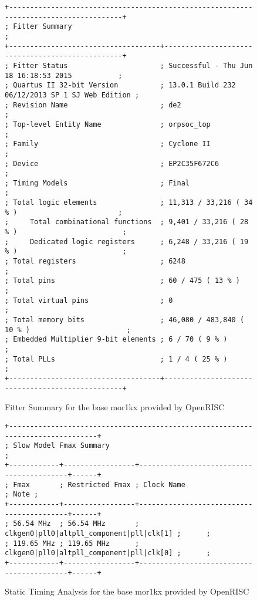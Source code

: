 \begin{figure}[t]
  \centering
  \footnotesize
  \begin{verbatim}
+--------------------------------------------------------------------------------------+
; Fitter Summary                                                                       ;
+------------------------------------+-------------------------------------------------+
; Fitter Status                      ; Successful - Thu Jun 18 16:18:53 2015           ;
; Quartus II 32-bit Version          ; 13.0.1 Build 232 06/12/2013 SP 1 SJ Web Edition ;
; Revision Name                      ; de2                                             ;
; Top-level Entity Name              ; orpsoc_top                                      ;
; Family                             ; Cyclone II                                      ;
; Device                             ; EP2C35F672C6                                    ;
; Timing Models                      ; Final                                           ;
; Total logic elements               ; 11,313 / 33,216 ( 34 % )                        ;
;     Total combinational functions  ; 9,401 / 33,216 ( 28 % )                         ;
;     Dedicated logic registers      ; 6,248 / 33,216 ( 19 % )                         ;
; Total registers                    ; 6248                                            ;
; Total pins                         ; 60 / 475 ( 13 % )                               ;
; Total virtual pins                 ; 0                                               ;
; Total memory bits                  ; 46,080 / 483,840 ( 10 % )                       ;
; Embedded Multiplier 9-bit elements ; 6 / 70 ( 9 % )                                  ;
; Total PLLs                         ; 1 / 4 ( 25 % )                                  ;
+------------------------------------+-------------------------------------------------+
  \end{verbatim}
  \caption{Fitter Summary for the base mor1kx provided by OpenRISC}
  \label{fig:fit_before}
\end{figure}

\begin{figure}[t]
  \centering
  \footnotesize
  \begin{verbatim}
+--------------------------------------------------------------------------------+
; Slow Model Fmax Summary                                                        ;
+------------+-----------------+------------------------------------------+------+
; Fmax       ; Restricted Fmax ; Clock Name                               ; Note ;
+------------+-----------------+------------------------------------------+------+
; 56.54 MHz  ; 56.54 MHz       ; clkgen0|pll0|altpll_component|pll|clk[1] ;      ;
; 119.65 MHz ; 119.65 MHz      ; clkgen0|pll0|altpll_component|pll|clk[0] ;      ;
+------------+-----------------+------------------------------------------+------+
  \end{verbatim}
  \caption{Static Timing Analysis for the base mor1kx provided by OpenRISC}
  \label{fig:sta_before}
\end{figure}

